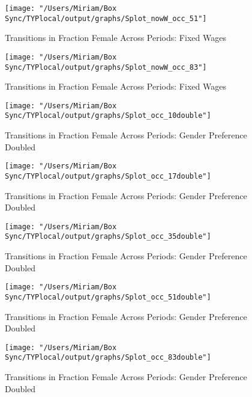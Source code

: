 \documentclass[11pt]{article}
\begin{document}
\begin{figure}[H]
\centering
\caption{Transitions in Fraction Female Across Periods: Fixed Wages}
\label{ftransitions51}
\texttt{[image: "/Users/Miriam/Box Sync/TYPlocal/output/graphs/Splot\_nowW\_occ\_51"]}
\end{figure}

\begin{figure}[H]
\centering
\caption{Transitions in Fraction Female Across Periods: Fixed Wages}
\label{ftransitions83}
\texttt{[image: "/Users/Miriam/Box Sync/TYPlocal/output/graphs/Splot\_nowW\_occ\_83"]}
\end{figure}


\begin{figure}[H]
\centering
\caption{Transitions in Fraction Female Across Periods: Gender Preference Doubled}
\label{ftransitions10}
\texttt{[image: "/Users/Miriam/Box Sync/TYPlocal/output/graphs/Splot\_occ\_10double"]}
\end{figure}

\begin{figure}[H]
\centering
\caption{Transitions in Fraction Female Across Periods: Gender Preference Doubled}
\label{ftransitions17}
\texttt{[image: "/Users/Miriam/Box Sync/TYPlocal/output/graphs/Splot\_occ\_17double"]}
\end{figure}

\begin{figure}[H]
\centering
\caption{Transitions in Fraction Female Across Periods: Gender Preference Doubled}
\label{ftransitions35}
\texttt{[image: "/Users/Miriam/Box Sync/TYPlocal/output/graphs/Splot\_occ\_35double"]}
\end{figure}

\begin{figure}[H]
\centering
\caption{Transitions in Fraction Female Across Periods: Gender Preference Doubled}
\label{ftransitions51}
\texttt{[image: "/Users/Miriam/Box Sync/TYPlocal/output/graphs/Splot\_occ\_51double"]}
\end{figure}

\begin{figure}[H]
\centering
\caption{Transitions in Fraction Female Across Periods: Gender Preference Doubled}
\label{ftransitions83}
\texttt{[image: "/Users/Miriam/Box Sync/TYPlocal/output/graphs/Splot\_occ\_83double"]}
\end{figure}
\end{document}

